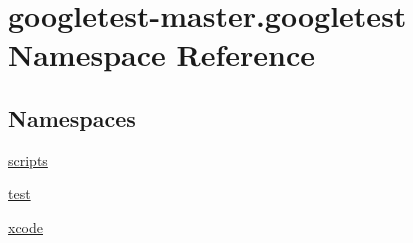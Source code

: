 \hypertarget{namespacegoogletest-master_1_1googletest}{}\section{googletest-\/master.googletest Namespace Reference}
\label{namespacegoogletest-master_1_1googletest}
\subsection*{Namespaces}
\begin{DoxyCompactItemize}
\item 
 \mbox{\hyperlink{namespacegoogletest-master_1_1googletest_1_1scripts}{scripts}}
\item 
 \mbox{\hyperlink{namespacegoogletest-master_1_1googletest_1_1test}{test}}
\item 
 \mbox{\hyperlink{namespacegoogletest-master_1_1googletest_1_1xcode}{xcode}}
\end{DoxyCompactItemize}
